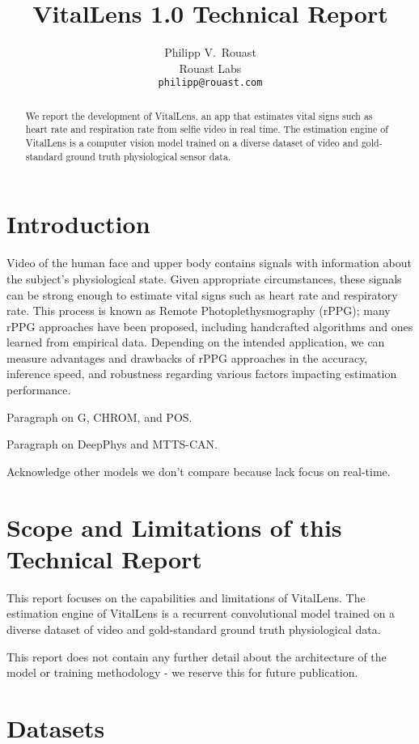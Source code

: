 \documentclass{article}
\title{VitalLens 1.0 Technical Report}
\author{%
  Philipp V.~Rouast \\
  Rouast Labs\\
  \texttt{philipp@rouast.com} \\
}
\begin{document}
\maketitle


\begin{abstract}
We report the development of VitalLens, an app that estimates vital signs such as heart rate and respiration rate from selfie video in real time.
The estimation engine of VitalLens is a computer vision model trained on a diverse dataset of video and gold-standard ground truth physiological sensor data.
\end{abstract}


\section{Introduction}

Video of the human face and upper body contains signals with information about the subject's physiological state.
Given appropriate circumstances, these signals can be strong enough to estimate vital signs such as heart rate and respiratory rate.
This process is known as Remote Photoplethysmography (rPPG); many rPPG approaches have been proposed, including handcrafted algorithms and ones learned from empirical data.
Depending on the intended application, we can measure advantages and drawbacks of rPPG approaches in the accuracy, inference speed, and robustness regarding various factors impacting estimation performance.

Paragraph on G, CHROM, and POS.

Paragraph on DeepPhys and MTTS-CAN.

Acknowledge other models we don't compare because lack focus on real-time.

\section{Scope and Limitations of this Technical Report}
\label{gen_inst}

This report focuses on the capabilities and limitations of VitalLens.
The estimation engine of VitalLens is a recurrent convolutional model trained on a diverse dataset of video and gold-standard ground truth physiological data.

This report does not contain any further detail about the architecture of the model or training methodology -
we reserve this for future publication.

\section{Datasets}
\label{headings}
\end{document}
